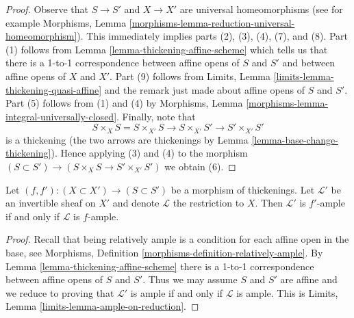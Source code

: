 \begin{proof}
Observe that $S \to S'$ and $X \to X'$ are universal homeomorphisms
(see for example
Morphisms, Lemma \ref{morphisms-lemma-reduction-universal-homeomorphism}).
This immediately implies parts (2), (3), (4), (7), and (8).
Part (1) follows from Lemma \ref{lemma-thickening-affine-scheme}
which tells us that there is a 1-to-1 correspondence between
affine opens of $S$ and $S'$ and between affine opens of $X$ and $X'$.
Part (9) follows from
Limits, Lemma \ref{limits-lemma-thickening-quasi-affine}
and the remark just made about affine opens of $S$ and $S'$.
Part (5) follows from (1) and (4) by
Morphisms, Lemma \ref{morphisms-lemma-integral-universally-closed}.
Finally, note that
$$
S \times_X S = S \times_{X'} S \to S \times_{X'} S' \to S' \times_{X'} S'
$$
is a thickening (the two arrows are thickenings by
Lemma \ref{lemma-base-change-thickening}).
Hence applying (3) and (4) to the morphism
$(S \subset S') \to (S \times_X S \to S' \times_{X'} S')$
we obtain (6).
\end{proof}

\begin{lemma}
\label{lemma-thicken-property-relatively-ample}
Let $(f, f') : (X \subset X') \to (S \subset S')$ be a morphism
of thickenings. Let $\mathcal{L}'$ be an invertible sheaf on $X'$
and denote $\mathcal{L}$ the restriction to $X$.
Then $\mathcal{L}'$ is $f'$-ample if and only if
$\mathcal{L}$ is $f$-ample.
\end{lemma}

\begin{proof}
Recall that being relatively ample is a condition for each
affine open in the base, see
Morphisms, Definition \ref{morphisms-definition-relatively-ample}.
By Lemma \ref{lemma-thickening-affine-scheme}
there is a 1-to-1 correspondence between
affine opens of $S$ and $S'$.
Thus we may assume $S$ and $S'$ are affine
and we reduce to proving that
$\mathcal{L}'$ is ample if and only if
$\mathcal{L}$ is ample.
This is Limits, Lemma \ref{limits-lemma-ample-on-reduction}.
\end{proof}


